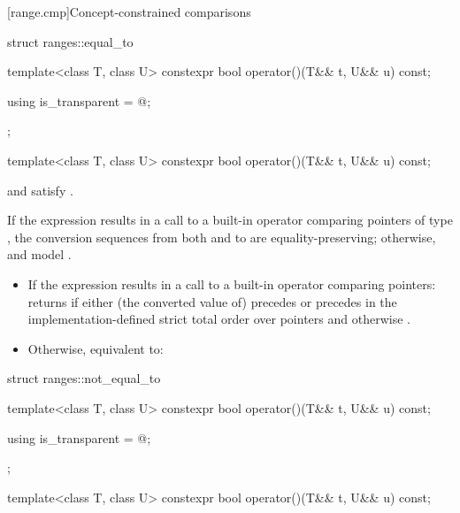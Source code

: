 [range.cmp]{Concept-constrained comparisons}

%
\begin{codeblock}
struct ranges::equal_to {
  template<class T, class U>
    constexpr bool operator()(T&& t, U&& u) const;

  using is_transparent = @\unspecnc@;
};
\end{codeblock}

\begin{itemdecl}
template<class T, class U>
  constexpr bool operator()(T&& t, U&& u) const;
\end{itemdecl}

\begin{itemdescr}
\pnum
\constraints
{} and  satisfy .

\pnum
\expects
If the expression 
results in a call to a built-in operator \tcode{==} comparing pointers of type
, the conversion sequences from both  and  to 
are equality-preserving;
otherwise,  and  model .

\pnum
\effects
\begin{itemize}
\item
  If the expression  results in
  a call to a built-in operator \tcode{==} comparing pointers:
  returns  if either (the converted value of)  precedes
   or  precedes  in the implementation-defined strict
  total order over pointers and otherwise .

\item
  Otherwise, equivalent to:
\end{itemize}
\end{itemdescr}

%
\begin{codeblock}
struct ranges::not_equal_to {
  template<class T, class U>
    constexpr bool operator()(T&& t, U&& u) const;

  using is_transparent = @\unspecnc@;
};
\end{codeblock}

\begin{itemdecl}
template<class T, class U>
  constexpr bool operator()(T&& t, U&& u) const;
\end{itemdecl}

